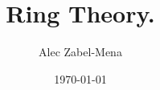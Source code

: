 \documentclass[12pt, twoside]{book}
\title{Ring Theory.}
\author{Alec Zabel-Mena}
\date{\today}
\begin{document}
\maketitle
\tableofcontents
\newpage



%

\nocite{*}



\end{document}
